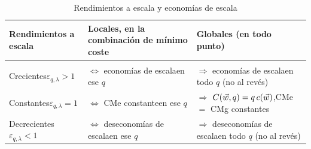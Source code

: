 \documentclass[11pt]{article}
\begin{document}
\begin{table}[H]
\centering\small
\caption{Rendimientos a escala y economías de escala}\label{tab:rendimientos-economias}
\renewcommand{\arraystretch}{1.3}
\begin{tabular}{|>{\centering\arraybackslash}m{}|>{\centering\arraybackslash}m{}|>{\centering\arraybackslash}m{}|}
\hline
\rowcolor{tceeazulpalido}\textbf{Rendimientos a escala} & \textbf{Locales, en la combinación de mínimo coste} & \textbf{Globales (en todo punto)}\\
\hline
\multicolumn{3}{|c|}{\cellcolor{tceesalvia}$\varepsilon_{q,\lambda}\big(\vect{z}(\vect{w},q)\big)=\mathrm{CMe}/\mathrm{CMg}=1/\varepsilon_{C,q}$}\\
\hline
\textcolor{tceeverde}{Crecientes}\newline\textcolor{tceeverde}{$\varepsilon_{q,\lambda}>1$} & \textcolor{tceeverde}{$\Longleftrightarrow$ economías de escala}\newline\textcolor{tceeverde}{en ese $q$} & \textcolor{tceeverde}{$\Longrightarrow$ economías de escala}\newline\textcolor{tceeverde}{en todo $q$ (no al revés)}\\
\hline
\textcolor{tceeazul}{Constantes}\newline\textcolor{tceeazul}{$\varepsilon_{q,\lambda}=1$} & \textcolor{tceeazul}{$\Longleftrightarrow$ CMe constante}\newline\textcolor{tceeazul}{en ese $q$} & \textcolor{tceeazul}{$\Longrightarrow$ $C(\vec{w},q)=q\,c(\vec{w})$,}\newline\textcolor{tceeazul}{CMe $=$ CMg constantes}\\
\hline
\textcolor{tceerojo}{Decrecientes}\newline\textcolor{tceerojo}{$\varepsilon_{q,\lambda}<1$} & \textcolor{tceerojo}{$\Longleftrightarrow$ deseconomías de escala}\newline\textcolor{tceerojo}{en ese $q$} & \textcolor{tceerojo}{$\Longrightarrow$ deseconomías de escala}\newline\textcolor{tceerojo}{en todo $q$ (no al revés)}\\
\hline
\end{tabular}
\par\vspace{2pt}{\footnotesize Con tecnología homotética, la equivalencia de la columna central vale a lo largo de toda la senda de expansión, que es un rayo.}
\end{table}
\end{document}
